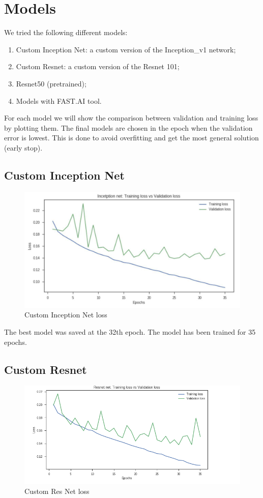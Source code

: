 \section{Models}

We tried the following different models:
\begin{enumerate}
	\item Custom Inception Net: a custom version of the Inception\_v1 network;
	\item Custom Resnet: a custom version of the Resnet 101;
	\item Resnet50 (pretrained);
	\item Models with FAST.AI tool.
\end{enumerate}

For each model we will show the comparison between validation and training loss by plotting them. The final models are chosen in the epoch when the validation error is lowest. This is done to avoid overfitting and get the most general solution (early stop).
\subsection{Custom Inception Net}

\begin{figure}[!h]
	\begin{center}
		\includegraphics[width=0.5\linewidth]{images/custom_inception_loss.jpg}
		\caption{Custom Inception Net loss}
		\label{fig:cust-incep-loss}
	\end{center}
\end{figure}

The best model was saved at the 32th epoch. The model has been trained for 35 epochs.

\subsection{Custom Resnet}

\begin{figure}[!h]
	\begin{center}
		\includegraphics[width=0.6\linewidth]{images/custom_resnet_loss.png}
		\caption{Custom Res Net loss}
		\label{fig:cust-resnet-loss}
	\end{center}
\end{figure}


